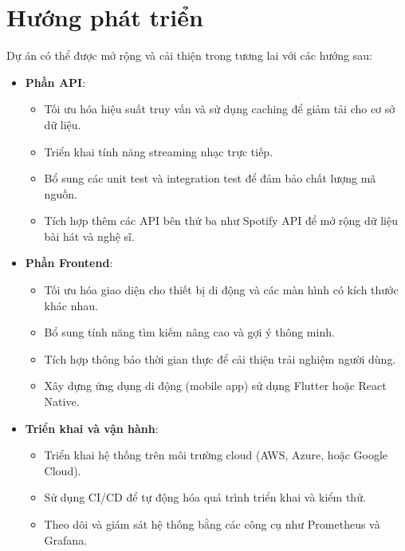 \section{Hướng phát triển}
Dự án có thể được mở rộng và cải thiện trong tương lai với các hướng sau:
\begin{itemize}
    \item \textbf{Phần API}:
    \begin{itemize}
        \item Tối ưu hóa hiệu suất truy vấn và sử dụng caching để giảm tải cho cơ sở dữ liệu.
        \item Triển khai tính năng streaming nhạc trực tiếp.
        \item Bổ sung các unit test và integration test để đảm bảo chất lượng mã nguồn.
        \item Tích hợp thêm các API bên thứ ba như Spotify API để mở rộng dữ liệu bài hát và nghệ sĩ.
    \end{itemize}
    \item \textbf{Phần Frontend}:
    \begin{itemize}
        \item Tối ưu hóa giao diện cho thiết bị di động và các màn hình có kích thước khác nhau.
        \item Bổ sung tính năng tìm kiếm nâng cao và gợi ý thông minh.
        \item Tích hợp thông báo thời gian thực để cải thiện trải nghiệm người dùng.
        \item Xây dựng ứng dụng di động (mobile app) sử dụng Flutter hoặc React Native.
    \end{itemize}
    \item \textbf{Triển khai và vận hành}:
    \begin{itemize}
        \item Triển khai hệ thống trên môi trường cloud (AWS, Azure, hoặc Google Cloud).
        \item Sử dụng CI/CD để tự động hóa quá trình triển khai và kiểm thử.
        \item Theo dõi và giám sát hệ thống bằng các công cụ như Prometheus và Grafana.
    \end{itemize}
\end{itemize}